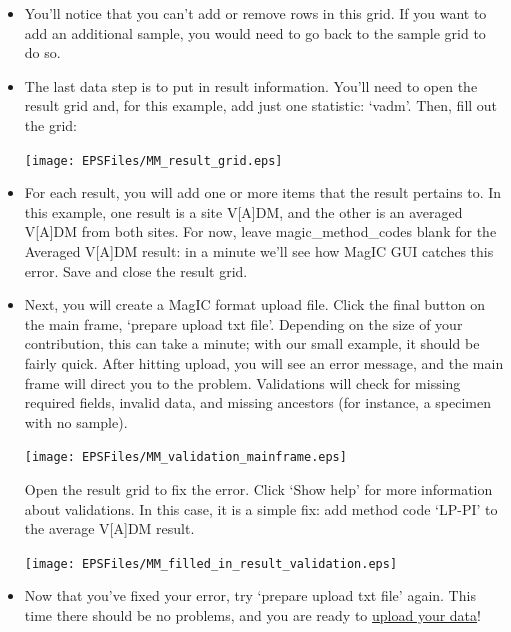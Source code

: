 \documentclass[11pt]{book}
\begin{document}
{{\begin{itemize}
  \item You'll notice that you can't add or remove rows in this grid.  If you want to add an additional sample, you would need to go back to the sample grid to do so.

  \item The last data step is to put in result information.  You'll need to open the result grid and, for this example, add just one statistic: `vadm'.  Then, fill out the grid:

    \texttt{[image: EPSFiles/MM\_result\_grid.eps]}

  \item For each result, you will add one or more items that the result pertains to.  In this example, one result is a site V[A]DM, and the other is an averaged V[A]DM from both sites.  For now, leave magic\_method\_codes blank for the Averaged V[A]DM result: in a minute we'll see how MagIC GUI catches this error.  Save and close the result grid.

  \item Next, you will create a MagIC format upload file.  Click the final button on the main frame, `prepare upload txt file'.  Depending on the size of your contribution, this can take a minute; with our small example, it should be fairly quick.  After hitting upload, you will see an error message, and the main frame will direct you to the problem.  Validations will check for missing required fields, invalid data, and missing ancestors (for instance, a specimen with no sample).

    \texttt{[image: EPSFiles/MM\_validation\_mainframe.eps]}

    Open the result grid to fix the error.  Click `Show help' for more information about validations.  In this case, it is a simple fix: add method code `LP-PI' to the average V[A]DM result.

    \texttt{[image: EPSFiles/MM\_filled\_in\_result\_validation.eps]}

  \item Now that you've fixed your error, try `prepare upload txt file' again.  This time there should be no problems, and you are ready to \href{#magic_upload}{upload your data}!

\end{itemize}




}}
\end{document}
